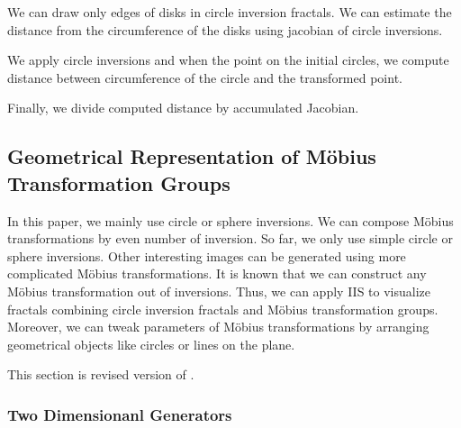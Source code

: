 We can draw only edges of disks in circle inversion fractals.
We can estimate the distance from the circumference of the disks using jacobian
of circle inversions.

We apply circle inversions and when the point on the initial circles,
we compute distance between circumference of the circle and the
transformed point.

Finally, we divide computed distance by accumulated Jacobian.


\subsection{Geometrical Representation of M\"obius Transformation Groups}


In this paper, we mainly use circle or sphere inversions.
We can compose M\"obius transformations by even number of
inversion.
So far, we only use simple circle or sphere inversions.
Other interesting images can be generated using more
complicated M\"obius transformations.
It is known that we can construct any M\"obius transformation out of
inversions.
Thus, we can apply IIS to visualize fractals combining circle inversion
fractals and M\"obius transformation groups.
Moreover, we can tweak parameters of M\"obius transformations by
arranging geometrical objects like circles or lines on the plane.

This section is revised version of \cite{bridges2017:159}.

\subsubsection{Two Dimensionanl Generators}

